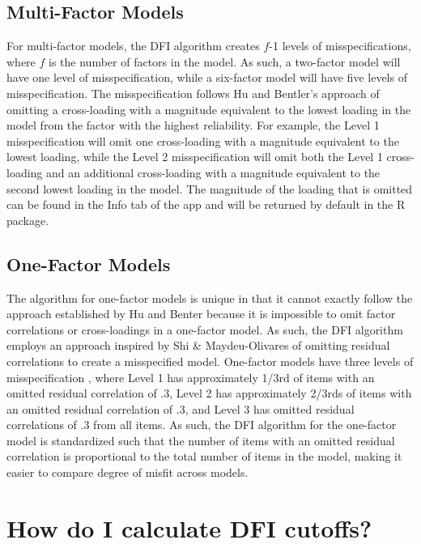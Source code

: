 \documentclass[
]{book}
\begin{document}
\hypertarget{multi-factor-models}{%
\section{Multi-Factor Models}\label{multi-factor-models}}

For multi-factor models, the DFI algorithm creates \(f\)-1 levels of misspecifications, where \(f\) is the number of factors in the model. As such, a two-factor model will have one level of misspecification, while a six-factor model will have five levels of misspecification. The misspecification follows Hu and Bentler's approach of omitting a cross-loading with a magnitude equivalent to the lowest loading in the model from the factor with the highest reliability. For example, the Level 1 misspecification will omit one cross-loading with a magnitude equivalent to the lowest loading, while the Level 2 misspecification will omit both the Level 1 cross-loading and an additional cross-loading with a magnitude equivalent to the second lowest loading in the model. The magnitude of the loading that is omitted can be found in the Info tab of the app and will be returned by default in the R package.

\hypertarget{one-factor-models}{%
\section{One-Factor Models}\label{one-factor-models}}

The algorithm for one-factor models is unique in that it cannot exactly follow the approach established by Hu and Benter \citeyearpar{hu_cutoff_1999} because it is impossible to omit factor correlations or cross-loadings in a one-factor model. As such, the DFI algorithm employs an approach inspired by Shi \& Maydeu-Olivares \citeyearpar{shi_effect_2020} of omitting residual correlations to create a misspecified model. One-factor models have three levels of misspecification , where Level 1 has approximately 1/3rd of items with an omitted residual correlation of .3, Level 2 has approximately 2/3rds of items with an omitted residual correlation of .3, and Level 3 has omitted residual correlations of .3 from all items. As such, the DFI algorithm for the one-factor model is standardized such that the number of items with an omitted residual correlation is proportional to the total number of items in the model, making it easier to compare degree of misfit across models.

\hypertarget{calculate}{%
\chapter{How do I calculate DFI cutoffs?}\label{calculate}}
\end{document}

